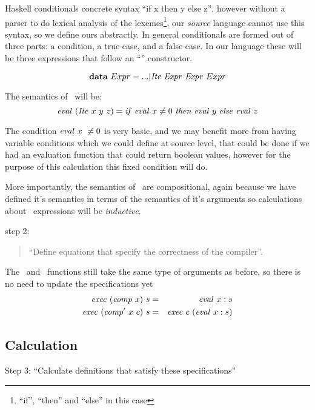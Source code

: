 \documentclass {article}
\begin{document}
Haskell conditionals concrete
syntax ``if  x then y else z'',
however without a parser to do
lexical analysis\cite[chapter 2.2]{dragon} of the lexemes\footnote{
``if'', ``then'' and ``else'' in this case},
our \emph{source} language cannot use this
syntax, so we define ours abstractly.
In general conditionals are formed out of three parts:
a condition, a true case, and a false case.
In our language these will be three expressions
that follow an ``\ite'' constructor.

\[ \textbf{data}\ Expr = ... | \mathit{Ite\ } \mathit{Expr\ } \mathit{Expr\ } Expr \]

\noindent The semantics of \ite\ will be:
\newcommand{\ifff}{\mathit{if\ }}
\newcommand{\tthen}{\mathit{then\ }}
\newcommand{\eelse }{\mathit{else\ }}
\begin{equation}
\evalf (\Ite x\ y\ z) \\
	= \ifff \evalf x \not= 0\ 
		\tthen \evalf y\ \eelse  \evalf z 
			\label{evalite}
\end{equation}

The condition $\mathit{eval\ } x\ \not= 0$ is very basic,
and we may benefit more from having variable conditions
which we could define at source level,
that could be done if we had an evaluation function 
that could return boolean values, 
however for the purpose of this calculation
this fixed condition will do.

More importantly, the semantics of \ite\
are compositional, 
again because we have defined it's
semantics in terms of the semantics of 
it's arguments so
calculations about \ite\ expressions
will be \emph{inductive}.

step 2: 
\begin{quote}
``Define equations that specify the correctness of the compiler''.
\end{quote}
The \exec\ and \comp\ functions still take the same
type of arguments as before,
so there is no need to update the specifications yet
\begin{eqnarray}
\mathit{exec\ }  (\mathit{comp\ }  x)\  s &=& \mathit{eval\ }   x:s \label{spec1.2}\\
\mathit{exec\ }  (\mathit{comp'\ }   x\  c)\ s &=& \mathit{exec\ }  c\  (\mathit{eval\ }  x:s) \label{spec2.2}
\end{eqnarray}

\subsection{Calculation}

Step 3: ``Calculate definitions that 
		satisfy these specifications''
\end{document}
